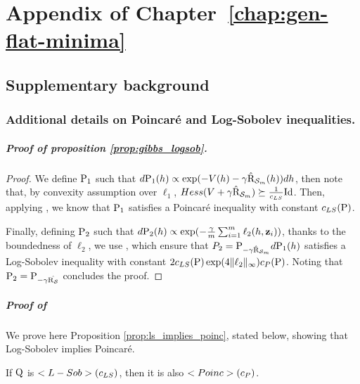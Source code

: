 \chapter{Appendix of Chapter~\ref{chap:gen-flat-minima}}
\label{ap: genflat-minima}

\begin{noaddcontents}
    \section{Supplementary background}
    \label{sec: supp_background}
    \subsection{Additional details on Poincaré and Log-Sobolev inequalities.}
    \paragraph{Proof of proposition \ref{prop:gibbs_logsob}.}
    
    \begin{proof}
        We define $\P_1$ such that $d\P_1(h)\propto \exp(-V(h) - \gamma \hat{\Risk}_{\S_m}(h))dh$, then note that, by convexity assumption over $\ell_1$, $Hess(V+\gamma\hat{\Risk}_{\S_m}) \succeq \frac{1}{c_{LS}}\mathrm{Id}$. Then, applying \citet[Corollary 2.1]{chafai2004entropies}, we know that $\P_1$ satisfies a Poincaré inequality with constant $c_{LS}(\P)$. 
      
        Finally, defining $\P_2$ such that $d\P_2(h) \propto \exp(-\frac{\gamma}{m}\sum_{i=1}^m \ell_2(h,\z_i))$, thanks to the boundedness of $\ell_2$, we use \citet[Property 2.6]{guionnet2003lectures}, which ensure that $P_2 = \P_{-\gamma \hat{\Risk}_{\S_m}}d \P_1(h)$ satisfies a Log-Sobolev inequality with constant $2c_{LS}(\P)\exp(4\|\ell_2\|_{\infty}) c_P(\P)$.
        Noting that $\P_2=\P_{-\gamma\hat{\Risk_\S}}$ concludes the proof.
      \end{proof}
    
    
    \paragraph{Proof of \citet[Propsition 2.1]{ledoux2006concentration}}
        We prove here Proposition \ref{prop:ls_implies_poinc}, stated below, showing that Log-Sobolev implies Poincaré.
     \begin{proposition}
        \label{prop:ls_implies_poinc}
        If $\Q$ is $\Lsob(c_{LS})$, then it is also $\Poinc(c_P)$. 
        

\end{proposition}
\end{noaddcontents}
